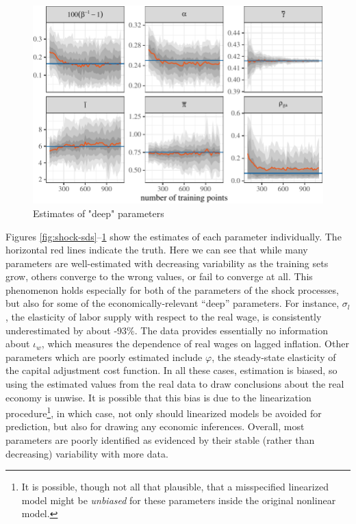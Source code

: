 \documentclass[11pt]{article}
\begin{document}
\begin{figure}[t]

{\centering \includegraphics{gfx/deep3-1} 

}

\caption{Estimates of "deep" parameters}\label{fig:deep3}
\end{figure}

Figures \ref{fig:shock-sds}--\ref{fig:deep3} show the estimates of each
parameter individually. The horizontal red lines indicate the truth.
Here we can see that while many parameters are well-estimated with
decreasing variability as the training sets grow, others converge to the
wrong values, or fail to converge at all. This phenomenon holds
especially for both of the parameters of the shock processes, but also
for some of the economically-relevant ``deep'' parameters. For instance,
\(\sigma_l\), the elasticity of labor supply with respect to the real
wage, is consistently underestimated by about -93\%. The data provides
essentially no information about \(\iota_w\), which measures the
dependence of real wages on lagged inflation. Other parameters which are
poorly estimated include \(\varphi\), the steady-state elasticity of the
capital adjustment cost function. In all these cases, estimation is
biased, so using the estimated values from the real data to draw
conclusions about the real economy is unwise. It is possible that this
bias is due to the linearization procedure\footnote{It is possible,
  though not all that plausible, that a misspecified linearized model
  might be \emph{unbiased} for these parameters inside the original
  nonlinear model.}, in which case, not only should linearized models be
avoided for prediction, but also for drawing any economic inferences.
Overall, most parameters are poorly identified as evidenced by their
stable (rather than decreasing) variability with more data.
\end{document}
